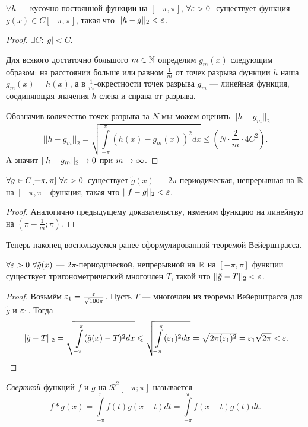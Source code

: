 \begin{Lemma}
    $\forall h$ --- кусочно-постоянной функции на $[-\pi, \pi]$, $ \forall \varepsilon > 0\  $ существует функция $ g(x)\in C[-\pi, \pi]$, такая что $||h-g||_2 < \varepsilon$.
\end{Lemma}
\begin{proof}
    $\exists C: |g| < C.$
    
    Для всякого достаточно большого $m \in \mathbb{N}$ определим $g_m(x)$ следующим образом: на расстоянии больше или равном $\frac{1}{m}$ от точек разрыва функции $h$ наша $g_m(x) = h(x)$, а в  $\frac{1}{m}$-окрестности точек разрыва $g_m$ --- линейная функция, соединяющая значения $h$ слева и справа от разрыва.
    
    Обозначив количество точек разрыва за $N$ мы можем оценить $||h-g_m||_2$
   $$ ||h-g_m||_2 = \sqrt{\int\limits_{-\pi}^{\pi}(h(x)-g_m(x))^2dx}\leq\left(N\cdot\frac{2}{m}\cdot4C^2 \right) .$$
   А значит $||h-g_m||_2\rightarrow0$ при $m \rightarrow \infty$.
\end{proof}


\begin{Lemma}
    $\forall g \in C[-\pi, \pi]\ \forall \varepsilon > 0$\ существует $\tilde{g}(x)$ --- $2\pi$-периодическая, непрерывная на $\mathbb{R}$ на $[-\pi, \pi]$ функция, такая что $||f-g||_2 < \varepsilon$.
\end{Lemma}
\begin{proof}
    Аналогично предыдущему доказательству, изменим функцию на линейную на $(\pi- \frac{1}{m}; \pi)$.
\end{proof}
Теперь наконец воспользуемся ранее сформулированной теоремой Вейерштрасса.
\begin{Lemma}
    $\forall \eps > 0\ \forall\tilde{g}(x)$ --- $2\pi$-периодической, непрерывной на $\mathbb{R}$ на $[-\pi, \pi]$ функции существует тригонометрический многочлен $T$, такой что $||\tilde{g}-T||_2 < \varepsilon$.
\end{Lemma}
\begin{proof}
   Возьмём $\varepsilon_1 = \frac{\varepsilon}{\sqrt{100\pi}}$.
   Пусть $T$ --- многочлен из теоремы Вейерштрасса для $\tilde{g}$ и $\varepsilon_1$.
   Тогда $$||\tilde{g}-T||_2=\sqrt{\int\limits_{-\pi}^{\pi}(\tilde{g}(x)-T)^2dx}\leqslant \sqrt{\int\limits_{-\pi}^{\pi}(\varepsilon_1)^2dx} = \sqrt{2\pi(\varepsilon_1)^2}=\varepsilon_1\sqrt{2\pi} < \varepsilon.$$
\end{proof}
\begin{Def}
    \textit{Сверткой} функций $f$ и $g$ на $\mathcal{R}^2[-\pi;\pi]$ называется
	$$
    f*g(x) = \int\limits_{-\pi}^{\pi} f(t)g(x-t)dt = \int\limits_{-\pi}^{\pi}f(x-t)g(t)dt.
    $$
\end{Def}

